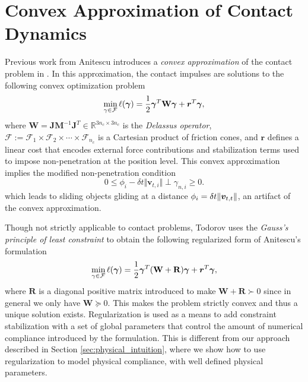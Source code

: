 \section{Convex Approximation of Contact Dynamics}
\label{sec:previous_work}

Previous work from Anitescu introduces a \textit{convex approximation} of the
contact problem in \cite{bib:anitescu2006}. In this approximation, the contact
impulses are solutions to the following convex optimization problem
\begin{eqnarray}
	\min_{\gamma\in \mathcal{F}} \ell(\bgamma) =
	\frac{1}{2}\bgamma^T\mathbf{W}\bgamma + {\bm r}^T \bgamma,
	\label{eq:dual_cost}
\end{eqnarray}
where $\mathbf{W} =
\mathbf{J}\mathbf{M}^{-1}\mathbf{J}^T\in\mathbb{R}^{3n_c\times 3n_c}$ is the
\emph{Delassus operator}, $\mathcal{F} := \mathcal{F}_1 \times \mathcal{F}_2
\times \cdots \times \mathcal{F}_{n_c}$ is a Cartesian product of friction
cones, and ${\bm r}$ defines a linear cost that encodes external force
contributions and stabilization terms used to impose non-penetration at the
position level. This convex approximation implies the modified non-penetration
condition
\begin{equation}
	0 \le \phi_i - \delta t \Vert {\bm v}_{t,i} \Vert \perp \gamma_{n,i} \ge 0.
	\label{eq:convex_approximation_complementarity_condition}
\end{equation}
which leads to sliding objects gliding at a distance $\phi_i = \delta
t\Vert{\bm{v}}_{t,t}\Vert$, an artifact of the convex approximation. 

Though not strictly applicable to contact problems, Todorov
\cite{bib:todorov2011, bib:todorov2014} uses the \emph{Gauss's principle of
least constraint} to obtain the following regularized form of Anitescu's
formulation
\begin{eqnarray}
	\min_{\gamma\in \mathcal{F}} \ell(\bgamma) =
	\frac{1}{2}\bgamma^T(\mathbf{W}+\mathbf{R})\bgamma + {\bm r}^T \bgamma,
	\label{eq:dual_regularized}
\end{eqnarray}
where $\mathbf{R}$ is a diagonal positive matrix introduced to make
$\mathbf{W}+\mathbf{R}\succ 0$ since in general we only have $\mathbf{W} \succeq
0$. This makes the problem strictly convex and thus a unique solution exists.
Regularization is used as a means to add constraint stabilization with a set of
global parameters that control the amount of numerical compliance introduced by
the formulation. This is different from our approach described in Section
\ref{sec:physical_intuition}, where we show how to use regularization to model
physical compliance, with well defined physical parameters.
